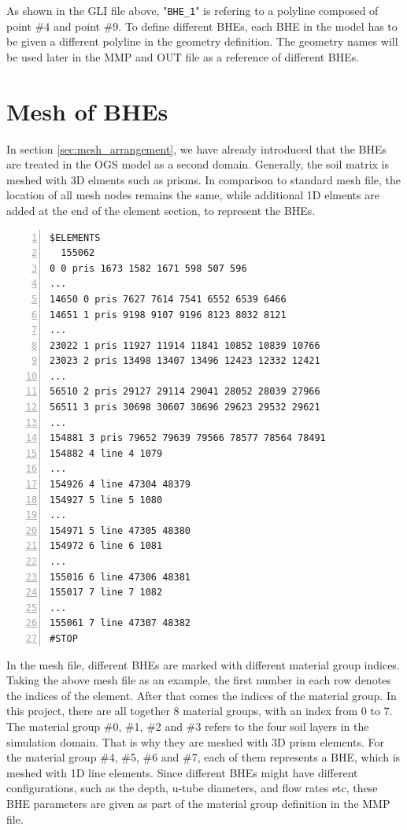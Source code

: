 As shown in the GLI file above,  "\texttt{BHE\_1}" is refering to a polyline composed of point \#4 and point \#9. To define different BHEs, each BHE in the model has to be given a different polyline in the geometry definition. The geometry names will be used later in the MMP and OUT file as a reference of different BHEs. 

\section{Mesh of BHEs}

In section \ref{sec:mesh_arrangement}, we have already introduced that the BHEs are treated in the OGS model as a second domain. Generally, the soil matrix is meshed with 3D elments such as prisms. In comparison to standard mesh file, the location of all mesh nodes remains the same, while additional 1D elments are added at the end of the element section, to represent the BHEs. 

\begin{Verbatim}[gobble=0, 
                 frame=single, 
                 label=The Element Section in Mesh File, 
                 numbers=left]
$ELEMENTS
  155062
0 0 pris 1673 1582 1671 598 507 596 
...
14650 0 pris 7627 7614 7541 6552 6539 6466 
14651 1 pris 9198 9107 9196 8123 8032 8121 
...
23022 1 pris 11927 11914 11841 10852 10839 10766 
23023 2 pris 13498 13407 13496 12423 12332 12421 
...
56510 2 pris 29127 29114 29041 28052 28039 27966 
56511 3 pris 30698 30607 30696 29623 29532 29621 
...
154881 3 pris 79652 79639 79566 78577 78564 78491 
154882 4 line 4 1079 
...
154926 4 line 47304 48379 
154927 5 line 5 1080 
...
154971 5 line 47305 48380 
154972 6 line 6 1081 
...
155016 6 line 47306 48381 
155017 7 line 7 1082 
...
155061 7 line 47307 48382 
#STOP
\end{Verbatim} 

In the mesh file, different BHEs are marked with different material group indices. Taking the above mesh file as an example, the first number in each row denotes the indices of the element. After that comes the indices of the material group. In this project, there are all together 8 material groups, with an index from 0 to 7. The material group \#0, \#1, \#2 and \#3 refers to the four soil layers in the simulation domain. That is why they are meshed with 3D prism elements. For the material group \#4, \#5, \#6 and \#7, each of them represents a BHE, which is meshed with 1D line elements. Since different BHEs might have different configurations, such as the depth, u-tube diameters, and flow rates etc, these BHE parameters are given as part of the material group definition in the MMP file. 

